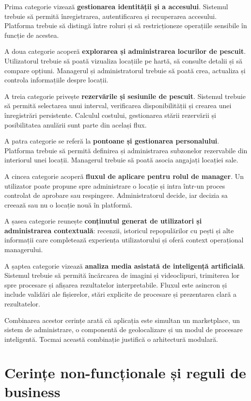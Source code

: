 Prima categorie vizează \textbf{gestionarea identității și a accesului}. Sistemul trebuie să permită înregistrarea, autentificarea și recuperarea accesului. Platforma trebuie să distingă între roluri și să restricționeze operațiile sensibile în funcție de acestea.

A doua categorie acoperă \textbf{explorarea și administrarea locurilor de pescuit}. Utilizatorul trebuie să poată vizualiza locațiile pe hartă, să consulte detalii și să compare opțiuni. Managerul și administratorul trebuie să poată crea, actualiza și controla informațiile despre locații.

A treia categorie privește \textbf{rezervările și sesiunile de pescuit}. Sistemul trebuie să permită selectarea unui interval, verificarea disponibilității și crearea unei înregistrări persistente. Calculul costului, gestionarea stării rezervării și posibilitatea anulării sunt parte din același flux.

A patra categorie se referă la \textbf{pontoane și gestionarea personalului}. Platforma trebuie să permită definirea și administrarea subzonelor rezervabile din interiorul unei locații. Managerul trebuie să poată asocia angajați locației sale.

A cincea categorie acoperă \textbf{fluxul de aplicare pentru rolul de manager}. Un utilizator poate propune spre administrare o locație și intra într-un proces controlat de aprobare sau respingere. Administratorul decide, iar decizia sa creează sau nu o locație nouă în platformă.

A șasea categorie reunește \textbf{conținutul generat de utilizatori și administrarea contextuală}: recenzii, istoricul repopulărilor cu pești și alte informații care completează experiența utilizatorului și oferă context operațional managerului.

A șaptea categorie vizează \textbf{analiza media asistată de inteligență artificială}. Sistemul trebuie să permită încărcarea de imagini și videoclipuri, trimiterea lor spre procesare și afișarea rezultatelor interpretabile. Fluxul este asincron și include validări ale fișierelor, stări explicite de procesare și prezentarea clară a rezultatelor.

Combinarea acestor cerințe arată că aplicația este simultan un marketplace, un sistem de administrare, o componentă de geolocalizare și un modul de procesare inteligentă. Tocmai această combinație justifică o arhitectură modulară.

\section{Cerințe non-funcționale și reguli de business}

